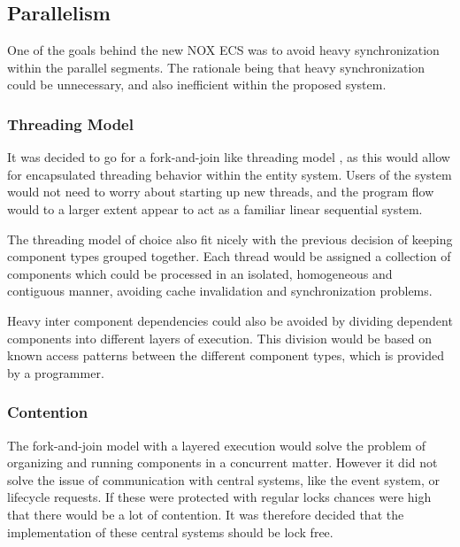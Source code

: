 \subsection{Parallelism}
One of the goals behind the new NOX ECS was to avoid heavy synchronization within the parallel segments.
The rationale being that heavy synchronization could be unnecessary, and also inefficient within the proposed system.

\subsubsection{Threading Model}
\label{subsubsec:high_level_threading_model}
It was decided to go for a fork-and-join like threading model ,
as this would allow for encapsulated threading behavior within the entity system.
Users of the system would not need to worry about starting up new threads,
and the program flow would to a larger extent appear to act as a familiar linear sequential system.

The threading model of choice also fit nicely with the previous decision of keeping component types
grouped together.
Each thread would be assigned a collection of components which could be processed in an isolated,
homogeneous and contiguous manner, avoiding cache invalidation and synchronization problems.

Heavy inter component dependencies could also be avoided by dividing dependent components
into different layers of execution. 
This division would be based on known access patterns between the different component types,
which is provided by a programmer.

\subsubsection{Contention}
The fork-and-join model with a layered execution would solve the problem of organizing and running components
in a concurrent matter. However it did not solve the issue of communication with central systems, like the event system, or lifecycle requests.
If these were protected with regular locks chances were high that there would be a lot of contention.
It was therefore decided that the implementation of these central systems should be lock free.

